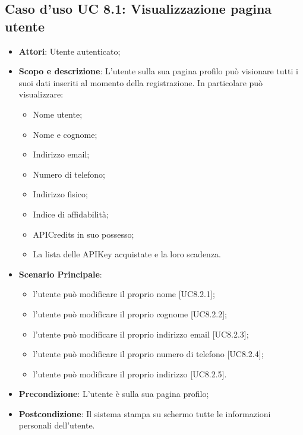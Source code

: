 \documentclass[12pt,a4paper,titlepage]{article}
\begin{document}
	\subsection{Caso d'uso UC 8.1: Visualizzazione pagina utente}
	\label{UC8.1}
	\begin{itemize}
		\item \textbf{Attori}: Utente autenticato;
		\item \textbf{Scopo e descrizione}: L'utente sulla sua pagina profilo può visionare tutti i suoi dati inseriti al momento della registrazione. In particolare può visualizzare:
		\begin{itemize}
			\item Nome utente;
			\item Nome e cognome;
			\item Indirizzo email;
			\item Numero di telefono;
			\item Indirizzo fisico;
			\item Indice di affidabilità;
			\item APICredits in suo possesso;
			\item La lista delle APIKey acquistate e la loro scadenza.
		\end{itemize}
		\item \textbf{Scenario Principale}:
		\begin{itemize}
			\item l'utente può modificare il proprio nome [UC8.2.1];
			\item l'utente può modificare il proprio cognome [UC8.2.2];
			\item l'utente può modificare il proprio indirizzo email [UC8.2.3];
			\item l'utente può modificare il proprio numero di telefono [UC8.2.4];
			\item l'utente può modificare il proprio indirizzo [UC8.2.5].
		\end{itemize}
		\item \textbf{Precondizione}: L'utente è sulla sua pagina profilo;
		\item \textbf{Postcondizione}: Il sistema stampa su schermo tutte le informazioni personali dell'utente.
	\end{itemize}
\end{document}

